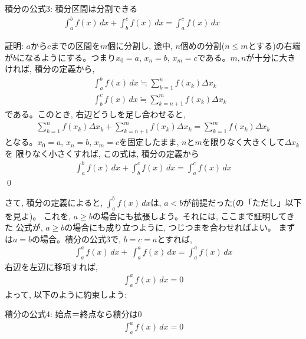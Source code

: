 \begin{itembox}{積分の公式3: 積分区間は分割できる}
\begin{eqnarray}
\int_{a}^{b}f(x)\, dx+\int_{b}^{c}f(x)\, dx=\int_{a}^{c}f(x)\, dx\,\,\,\,\,\,\,\,\,\,\,\,\,\,\,\,\,\label{eq:sekibun_koshiki3}
\end{eqnarray}
\end{itembox}
証明: $a$から$c$までの区間を$m$個に分割し, 途中, $n$個めの分割($n\leq m$とする)の右端
が$b$になるようにする。つまり$x_0=a$, $x_n=b$, $x_m=c$である。$m, n$が十分に大きければ, 
積分の定義から, 
\begin{eqnarray}
&&\int_{a}^{b}f(x)\, dx \fallingdotseq \sum_{k=1}^n f(x_k)\Delta x_k\\
&&\int_{b}^{c}f(x)\, dx \fallingdotseq \sum_{k=n+1}^m f(x_k)\Delta x_k
\end{eqnarray}
である。このとき, 右辺どうしを足し合わせると, 
\begin{eqnarray*}
\sum_{k=1}^n f(x_k)\Delta x_k + \sum_{k=n+1}^m f(x_k)\Delta x_k = \sum_{k=1}^m f(x_k)\Delta x_k
\end{eqnarray*}
となる。$x_0=a$, $x_n=b$, $x_m=c$を固定したまま, $n$と$m$を限りなく大きくして$\Delta x_k$を
限りなく小さくすれば, この式は, 積分の定義から
\begin{eqnarray*}
\int_{a}^{b} f(x)\, dx + \int_{b}^{c} f(x)\, dx = \int_{a}^{c} f(x)\, dx
\end{eqnarray*}
\qed
\vspace{0.3cm}

さて, 積分の定義によると, $\int_{a}^{b}f(x)\,dx$は, 
$a<b$が前提だった(の「ただし」以下を見よ)。
これを, $a\geq b$の場合にも拡張しよう。それには, ここまで証明してきた
公式が, $a\geq b$の場合にも成り立つように, つじつまを合わせればよい。
まずは$a=b$の場合。積分の公式3で, $b=c=a$とすれば, 
\begin{eqnarray*}
\int_{a}^{a}f(x)\,dx +\, \int_{a}^{a}f(x)\, dx = \int_{a}^{a}f(x)\, dx
\end{eqnarray*}
右辺を左辺に移項すれば, 
\begin{eqnarray*}
\int_{a}^{a}f(x)\, dx=0
\end{eqnarray*}
よって, 以下のように約束しよう:
\begin{itembox}{積分の公式4: 始点＝終点なら積分は0}
\begin{eqnarray}
\int_{a}^{a}f(x)\, dx=0\label{ed_int_th4}
\end{eqnarray}
\end{itembox}
\vspace{0.3cm}

